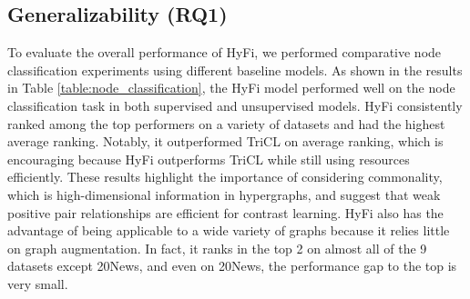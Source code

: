 \subsection{Generalizability (RQ1)}

To evaluate the overall performance of HyFi, we performed comparative node classification experiments using different baseline models. As shown in the results in Table \ref{table:node_classification}, the HyFi model performed well on the node classification task in both supervised and unsupervised models. HyFi consistently ranked among the top performers on a variety of datasets and had the highest average ranking. Notably, it outperformed TriCL on average ranking, which is encouraging because HyFi outperforms TriCL while still using resources efficiently. These results highlight the importance of considering commonality, which is high-dimensional information in hypergraphs, and suggest that weak positive pair relationships are efficient for contrast learning. HyFi also has the advantage of being applicable to a wide variety of graphs because it relies little on graph augmentation. In fact, it ranks in the top 2 on almost all of the 9 datasets except 20News, and even on 20News, the performance gap to the top is very small.



